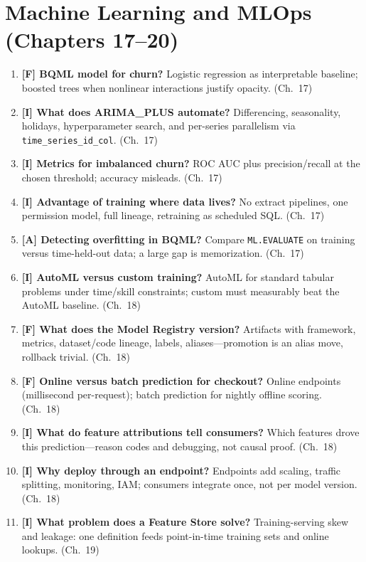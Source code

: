 \section{Machine Learning and MLOps (Chapters 17--20)}
\begin{enumerate}
    \item \textbf{[F] BQML model for churn?} Logistic regression as interpretable baseline;
    boosted trees when nonlinear interactions justify opacity. (Ch.~17)
    \item \textbf{[I] What does ARIMA\_PLUS automate?} Differencing, seasonality, holidays,
    hyperparameter search, and per-series parallelism via \texttt{time\_series\_id\_col}. (Ch.~17)
    \item \textbf{[I] Metrics for imbalanced churn?} ROC AUC plus precision/recall at the chosen
    threshold; accuracy misleads. (Ch.~17)
    \item \textbf{[I] Advantage of training where data lives?} No extract pipelines, one
    permission model, full lineage, retraining as scheduled SQL. (Ch.~17)
    \item \textbf{[A] Detecting overfitting in BQML?} Compare \texttt{ML.EVALUATE} on training
    versus time-held-out data; a large gap is memorization. (Ch.~17)
    \item \textbf{[I] AutoML versus custom training?} AutoML for standard tabular problems under
    time/skill constraints; custom must measurably beat the AutoML baseline. (Ch.~18)
    \item \textbf{[F] What does the Model Registry version?} Artifacts with framework, metrics,
    dataset/code lineage, labels, aliases---promotion is an alias move, rollback trivial. (Ch.~18)
    \item \textbf{[F] Online versus batch prediction for checkout?} Online endpoints (millisecond
    per-request); batch prediction for nightly offline scoring. (Ch.~18)
    \item \textbf{[I] What do feature attributions tell consumers?} Which features drove this
    prediction---reason codes and debugging, not causal proof. (Ch.~18)
    \item \textbf{[I] Why deploy through an endpoint?} Endpoints add scaling, traffic splitting,
    monitoring, IAM; consumers integrate once, not per model version. (Ch.~18)
    \item \textbf{[I] What problem does a Feature Store solve?} Training-serving skew and
    leakage: one definition feeds point-in-time training sets and online lookups. (Ch.~19)

\end{enumerate}
